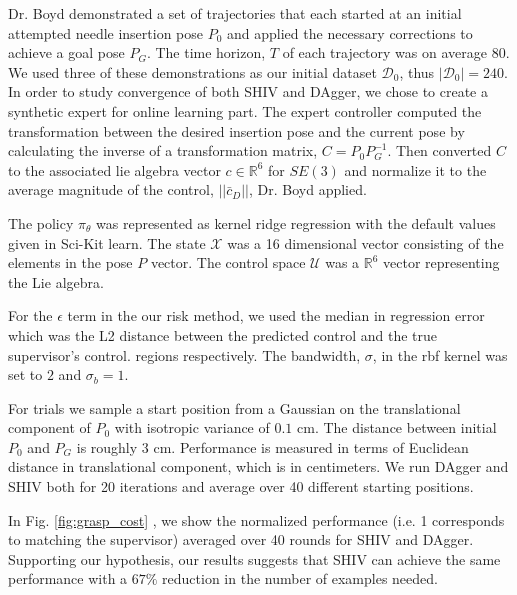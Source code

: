 \documentclass[10pt, conference]{ieeeconf}      %
\begin{document}
Dr. Boyd demonstrated a set of trajectories that each started at an initial attempted needle insertion pose $P_0$ and
applied the necessary corrections to achieve a goal pose $P_G$. The time horizon, $T$ of each trajectory was on average 80.  We used three of these demonstrations as our initial
dataset $\mathcal{D}_0$, thus $|\mathcal{D}_0| = 240$. In order to study convergence of both SHIV and DAgger, we chose to create a synthetic expert for online learning part. The expert controller computed the transformation between the desired insertion pose and the current pose  by calculating the inverse of a transformation matrix, $C = P_0P_G^{-1}$. Then converted $C$ to the associated lie algebra vector $c \in \mathbb{R}^6$ for $SE(3)$ and normalize it to the average magnitude of the control,  $||\bar{c}_D||$, Dr. Boyd applied. 

The policy $\pi_{\theta}$ was represented as kernel ridge regression with the default values given in Sci-Kit learn. The state $\mathcal{X}$ was  a 16 dimensional vector consisting of the elements in the pose $P$ vector. The control space $\mathcal{U}$ was a $\mathbb{R}^6$ vector representing the Lie algebra. 

For the $\epsilon$ term in the our risk method, we used the median in regression error which was the L2 distance between the predicted control and the true supervisor's control. 
regions respectively. The bandwidth, $\sigma$, in the rbf kernel was set to $2$ and $\sigma_b = 1$.

For trials we sample a start position from a Gaussian on the translational component of $P_0$ with isotropic variance of
$0.1$ cm. The distance between initial $P_0$ and $P_G$ is roughly $3$ cm. Performance is measured in
terms of Euclidean distance in translational component, which is in centimeters. We run DAgger and SHIV both for 20 iterations and average over 40 different starting positions.

 In Fig. \ref{fig:grasp_cost} , we show the normalized performance (i.e. 1 corresponds to matching the supervisor) averaged over 40 rounds for SHIV and DAgger. Supporting our hypothesis, our results suggests that SHIV can achieve the same performance with a $67\%$ reduction in the number of examples needed.
\end{document}
